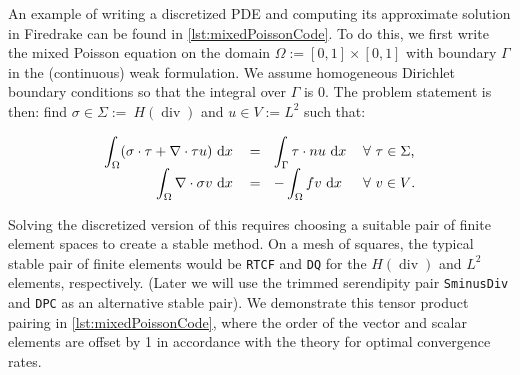 \documentclass[format=acmsmall,screen,timestamp=false,a4paper]{acmart}
\DeclareMathOperator{\Div}{div}
\newcommand\akg[1]{\textbf{\textcolor[rgb]{.5,0,1}{[Andrew: #1]}}}
\newcommand\lm[1]{\textbf{\textcolor[rgb]{1,0,0.5}{[Lawrence: #1]}}}
\newcommand{\hdiv}{\ensuremath{{H}(\Div)}\xspace}
\begin{document}

An example of writing a discretized PDE and computing its approximate solution in Firedrake can be found in \cref{lst:mixedPoissonCode}. To do this, we first write the mixed Poisson equation on the domain $\Omega := [0, 1] \times [0,1]$ with boundary $\Gamma$ in the (continuous) weak formulation.  We assume homogeneous Dirichlet boundary conditions so that the integral over $\Gamma$ is $0$.  The problem statement is then:
find $\sigma \in \Sigma :=~$\hdiv and $u \in V := L^2$ such that:%

\begin{equation}\label{eq:MixedPoisson}
\begin{tabular}{rllll}

$\displaystyle\int_\Omega (\sigma \cdot \tau + \nabla\cdot\tau u) \text{ d}x$ & $=~~\displaystyle \int_\Gamma \tau \cdot n u \text{ d}x$ & $\forall~ \tau\in\Sigma$, \\
$\displaystyle\int_\Omega \nabla \cdot \sigma v \text{ d}x$ & $= ~~\displaystyle -\int_\Omega fv \text{ d}x$ & $\forall~ v\in V$.
\end{tabular}
\end{equation}

Solving the discretized version of this requires choosing a suitable pair of finite element spaces to create a stable method.  On a mesh of squares, the typical stable pair of finite elements would be \texttt{RTCF} and \texttt{DQ} for the \hdiv and $L^2$ elements, respectively.  (Later we will use the trimmed serendipity pair \texttt{SminusDiv} and \texttt{DPC} as an alternative stable pair).  We demonstrate this tensor product pairing in \cref{lst:mixedPoissonCode}, where the order of the vector and scalar elements are offset by 1 in accordance with the theory for optimal convergence rates.

  
\end{document}
